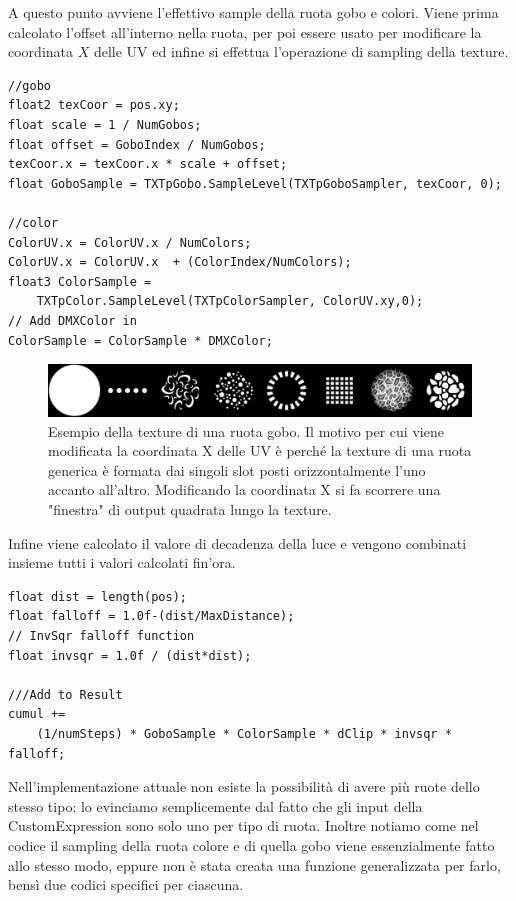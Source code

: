 \documentclass[main.tex]{subfiles}
\begin{document}
\noindent A questo punto avviene l'effettivo sample della ruota gobo e colori. Viene prima calcolato l'offset all'interno nella ruota, per poi essere usato per modificare la coordinata $X$ delle UV ed infine si effettua l'operazione di sampling della texture.
\begin{lstlisting}
//gobo
float2 texCoor = pos.xy;
float scale = 1 / NumGobos;
float offset = GoboIndex / NumGobos;
texCoor.x = texCoor.x * scale + offset;
float GoboSample = TXTpGobo.SampleLevel(TXTpGoboSampler, texCoor, 0);

//color
ColorUV.x = ColorUV.x / NumColors;
ColorUV.x = ColorUV.x  + (ColorIndex/NumColors);
float3 ColorSample =
    TXTpColor.SampleLevel(TXTpColorSampler, ColorUV.xy,0);
// Add DMXColor in
ColorSample = ColorSample * DMXColor;
\end{lstlisting}
\begin{figure}[H]
    \centering
    \includegraphics[width=1\linewidth]{img/renderingPipeline/Wheel_Rotating_Gobo_Wheel.jpg}
    \caption{Esempio della texture di una ruota gobo. Il motivo per cui viene modificata la coordinata X delle UV è perché la texture di una ruota generica è formata dai singoli slot posti orizzontalmente l'uno accanto all'altro. Modificando la coordinata X si fa scorrere una "finestra" di output quadrata lungo la texture.}
    \label{fig:2_goboWheel}
\end{figure}
Infine viene calcolato il valore di decadenza della luce e vengono combinati insieme tutti i valori calcolati fin'ora.
\begin{lstlisting}
float dist = length(pos);
float falloff = 1.0f-(dist/MaxDistance);
// InvSqr falloff function
float invsqr = 1.0f / (dist*dist);

///Add to Result
cumul +=
    (1/numSteps) * GoboSample * ColorSample * dClip * invsqr * falloff;
\end{lstlisting}

Nell'implementazione attuale non esiste la possibilità di avere più ruote dello stesso tipo: lo evinciamo semplicemente dal fatto che gli input della CustomExpression sono solo uno per tipo di ruota. Inoltre notiamo come nel codice il sampling della ruota colore e di quella gobo viene essenzialmente fatto allo stesso modo, eppure non è stata creata una funzione generalizzata per farlo, bensì due codici specifici per ciascuna. 
\end{document}
